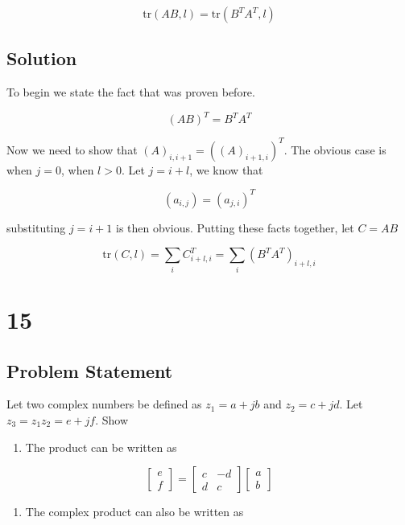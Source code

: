 \documentclass[11pt,a4paper,final]{article}
\begin{document}
$$
\text{tr}(AB, l) = \text{tr}(B^T A^T, l)
$$

\subsection{Solution}
\label{sec:org90cec7b}
To begin we state the fact that was proven before.

$$
(AB)^T = B^T A^T
$$

Now we need to show that \((A)_{i,i+1} = ((A)_{i+1, i})^T\). The obvious case is when \(j=0\), when \(l>0\). Let \(j = i+l\), we
know that

$$
(a_{i,j}) = (a_{j,i})^T
$$

substituting \(j=i+1\) is then obvious. Putting these facts together, let \(C=AB\)

$$
\text{tr}(C,l) = \sum_{i} C^T_{i+l,i} = \sum_{i} (B^T A^T)_{i+l,i}
$$

\section{15}
\label{sec:orga4e9e0c}

\subsection{Problem Statement}
\label{sec:org2c959c9}
Let two complex numbers be defined as \(z_1 = a + jb\) and \(z_2 = c + jd\). Let \(z_3 = z_1 z_2 = e + jf\). Show

\begin{enumerate}
\item The product can be written as
\end{enumerate}

\begin{equation*}
\begin{bmatrix} e \\ f \end{bmatrix} =
\begin{bmatrix} c & -d \\ d & c \end{bmatrix}
\begin{bmatrix} a \\ b \end{bmatrix}
\end{equation*}

\begin{enumerate}
\item The complex product can also be written as
\end{enumerate}
\end{document}
